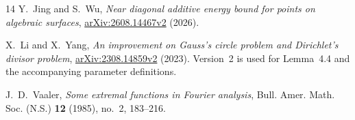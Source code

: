 \documentclass[11pt,reqno]{amsart}
\numberwithin{equation}{section}
\theoremstyle{definition}
\theoremstyle{remark}
\begin{document}
\begin{thebibliography}{14}
Y.~Jing and S.~Wu,
\emph{Near diagonal additive energy bound for points on algebraic surfaces},
\href{https://arxiv.org/abs/2608.14467v2}{arXiv:2608.14467v2} (2026).

X.~Li and X.~Yang,
\emph{An improvement on Gauss's circle problem and Dirichlet's divisor problem},
\href{https://arxiv.org/abs/2308.14859v2}{arXiv:2308.14859v2} (2023).
Version~2 is used for Lemma~4.4 and the accompanying parameter definitions.

J.~D.~Vaaler,
\emph{Some extremal functions in Fourier analysis},
Bull. Amer. Math. Soc. (N.S.) \textbf{12} (1985), no.~2, 183--216.

\end{thebibliography}
\end{document}
